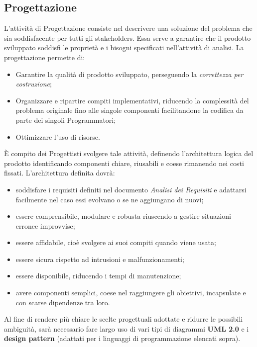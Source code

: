 \documentclass[NormeDiProgetto.tex]{subfiles}
\begin{document}





\subsection{Progettazione}
L’attività di Progettazione consiste nel descrivere una soluzione del problema
che sia soddisfacente per tutti gli stakeholders. Essa serve a garantire che
il prodotto sviluppato soddisfi le proprietà e i bisogni specificati nell’attività
di analisi. La progettazione permette di:
\begin{itemize}
	\item Garantire la qualità di prodotto sviluppato, perseguendo la \textit{correttezza
		per costruzione};
	\item Organizzare e ripartire compiti implementativi, riducendo la
	complessità del problema originale fino alle singole componenti
	facilitandone la codifica da parte dei singoli Programmatori;
	\item Ottimizzare l’uso di risorse.
\end{itemize}
\`{E} compito dei Progettisti svolgere tale attività, definendo l’architettura logica
del prodotto identificando componenti chiare, riusabili e coese rimanendo nei
costi fissati. L’architettura definita dovrà:
\begin{itemize}
	\item soddisfare i requisiti definiti nel documento \textit{Analisi dei Requisiti} e adattarsi facilmente nel caso essi evolvano o se ne aggiungano di nuovi; 
	\item essere comprensibile, modulare e robusta riuscendo a gestire situazioni erronee improvvise;
	\item essere affidabile, cioè svolgere ai suoi compiti quando viene usata;
	\item essere sicura rispetto ad intrusioni e malfunzionamenti;
	\item essere disponibile, riducendo i tempi di manutenzione;
	\item avere componenti semplici, coese nel raggiungere gli obiettivi, incapsulate e con scarse dipendenze tra loro.
\end{itemize}
Al fine di rendere più chiare le scelte progettuali adottate e
ridurre le possibili ambiguità, sarà necessario fare largo uso di vari tipi di diagrammi 
\textbf{UML 2.0} e i \textbf{design pattern} (adattati per i linguaggi di programmazione elencati sopra).
\end{document}
